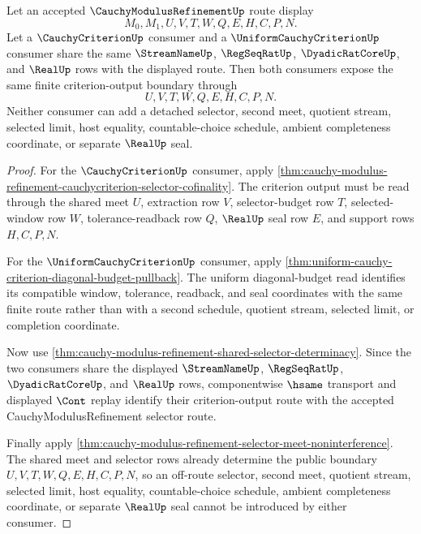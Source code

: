 \begin{theorem}
\label{thm:cauchy-modulus-refinement-criterion-output-boundary}
Let an accepted $\CauchyModulusRefinementUp$ route display
$$
M_0,M_1,U,V,T,W,Q,E,H,C,P,N.
$$
Let a $\CauchyCriterionUp$ consumer and a $\UniformCauchyCriterionUp$ consumer share the same $\StreamNameUp$, $\RegSeqRatUp$, $\DyadicRatCoreUp$, and $\RealUp$ rows with the displayed route. Then both consumers expose the same finite criterion-output boundary through
$$
U,V,T,W,Q,E,H,C,P,N.
$$
Neither consumer can add a detached selector, second meet, quotient stream, selected limit, host equality, countable-choice schedule, ambient completeness coordinate, or separate $\RealUp$ seal.
\end{theorem}
\begin{proof}
For the $\CauchyCriterionUp$ consumer, apply \autoref{thm:cauchy-modulus-refinement-cauchycriterion-selector-cofinality}. The criterion output must be read through the shared meet $U$, extraction row $V$, selector-budget row $T$, selected-window row $W$, tolerance-readback row $Q$, $\RealUp$ seal row $E$, and support rows $H,C,P,N$.

For the $\UniformCauchyCriterionUp$ consumer, apply \autoref{thm:uniform-cauchy-criterion-diagonal-budget-pullback}. The uniform diagonal-budget read identifies its compatible window, tolerance, readback, and seal coordinates with the same finite route rather than with a second schedule, quotient stream, selected limit, or completion coordinate.

Now use \autoref{thm:cauchy-modulus-refinement-shared-selector-determinacy}. Since the two consumers share the displayed $\StreamNameUp$, $\RegSeqRatUp$, $\DyadicRatCoreUp$, and $\RealUp$ rows, componentwise $\hsame$ transport and displayed $\Cont$ replay identify their criterion-output route with the accepted CauchyModulusRefinement selector route.

Finally apply \autoref{thm:cauchy-modulus-refinement-selector-meet-noninterference}. The shared meet and selector rows already determine the public boundary $U,V,T,W,Q,E,H,C,P,N$, so an off-route selector, second meet, quotient stream, selected limit, host equality, countable-choice schedule, ambient completeness coordinate, or separate $\RealUp$ seal cannot be introduced by either consumer.
\end{proof}

